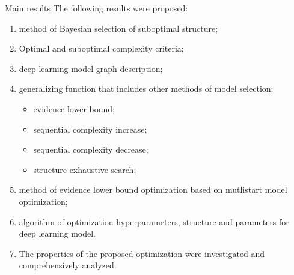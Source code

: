 \documentclass[usenames,dvipsnames,11pt,pdf,utf8,russian,aspectratio=43]{beamer}
\begin{document}
\begin{frame}{Main results}
\footnotesize
The following results were proposed:
\begin{enumerate}
\item method of Bayesian selection of suboptimal structure;
\item Optimal and suboptimal complexity criteria;
\item deep learning model graph description;
\item generalizing function that includes other methods of model selection:
\begin{itemize}
\footnotesize
\item evidence lower bound;
\item sequential complexity increase;
\item sequential complexity decrease;
\item structure exhaustive search;
\end{itemize}


\item method of evidence lower bound optimization based on mutlistart model optimization;
\item algorithm of optimization hyperparameters, structure and parameters for deep learning model.
\item The properties of the proposed optimization were investigated and comprehensively analyzed.

\end{enumerate}
\end{frame}
\end{document}
